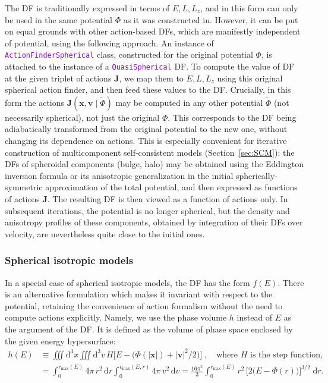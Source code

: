\documentclass[12pt]{article}
\newcommand{\ttt}[1]{\textcolor{darkviolet}{\texttt{#1}}}
\renewcommand{\d}{\mathrm{d}}
\newcommand{\bv}{\boldsymbol{v}}
\newcommand{\bx}{\boldsymbol{x}}
\newcommand{\bJ}{\boldsymbol{J}}
\begin{document}
The DF is traditionally expressed in terms of $E,L,L_z$, and in this form can only be used in the same potential $\Phi$ as it was constructed in. However, it can be put on equal grounds with other action-based DFs, which are manifestly independent of potential, using the following approach.
An instance of \ttt{ActionFinderSpherical} class, constructed for the original potential $\Phi$, is attached to the instance of a \ttt{QuasiSpherical} DF. To compute the value of DF at the given triplet of actions $\bJ$, we map them to $E,L,L_z$ using this original spherical action finder, and then feed these values to the DF. Crucially, in this form the actions $\bJ(\bx,\bv \;|\;\tilde\Phi)$ may be computed in any other potential $\tilde\Phi$ (not necessarily spherical), not just the original $\Phi$. This corresponds to the DF being adiabatically transformed from the original potential to the new one, without changing its dependence on actions.
This is especially convenient for iterative construction of multicomponent self-consistent models (Section~\ref{sec:SCM}): the DFs of spheroidal components (bulge, halo) may be obtained using the Eddington inversion formula or its anisotropic generalization in the initial spherically-symmetric approximation of the total potential, and then expressed as functions of actions $\bJ$. The resulting DF is then viewed as a function of actions only. In subsequent iterations, the potential is no longer spherical, but the density and anisotropy profiles of these components, obtained by integration of their DFs over velocity, are nevertheless quite close to the initial ones.


\subsubsection{Spherical isotropic models}  \label{sec:DFsphericalIsotropic}

In a special case of spherical isotropic models, the DF has the form $f(E)$. There is an alternative formulation which makes it invariant with respect to the potential, retaining the convenience of action formalism without the need to compute actions explicitly. Namely, we use the phase volume $h$ instead of $E$ as the argument of the DF. It is defined as the volume of phase space enclosed by the given energy hypersurface:
\begin{align*}
h(E) &\equiv \iiint \d ^3x \iiint \d ^3v\, H\Big[E - \big(\Phi(|\bx|)+|\bv|^2/2\big)\Big] \;,\quad
\mbox{where $H$ is the step function,} \\
&= \int_0^{r_\mathrm{max}(E)} 4\pi\,r^2\,\d r \int_0^{v_\mathrm{max}(E,r)} 4\pi\, v^2\,\d v =
\frac{16\pi^2}{3} \int_0^{r_\mathrm{max}(E)} r^2\, \Big[2\big(E-\Phi(r)\big)\Big]^{3/2}\;\d r.
\end{align*}
\end{document}

